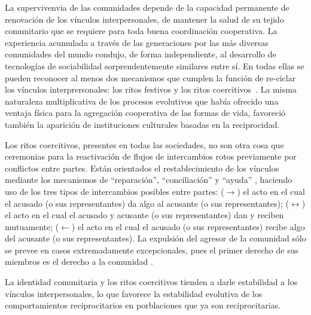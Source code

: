 \documentclass[a4paper,10pt]{book}
\theoremstyle{definition}
\begin{document}

La supervivenvia de las comunidades depende de la capacidad permanente de renovación de los vínculos interpersonales, de mantener la salud de su tejido comunitario que se requiere para toda buena coordinación cooperativa.
La experiencia acumulada a través de las generaciones por las más diversas comunidades del mundo condujo, de forma independiente, al desarrollo de tecnologías de sociabilidad sorprendentemente similares entre sí.
En todas ellas se pueden reconocer al menos dos mecanismos que cumplen la función de re-ciclar los v\'inculos interprersonales: los ritos festivos y los ritos coercitivos~\cite{segato2016-guerraContraLasMujeres}.
La misma naturaleza multiplicativa de los procesos evolutivos que había ofrecido una ventaja física para la agregación cooperativa de las formas de vida, favoreció también la aparición de instituciones culturales basadas en la reciprocidad.


Los ritos coercitivos, presentes en todas las sociedades, no son otra cosa que ceremonias para la reactivación de flujos de intercambios rotos previamente por conflictos entre partes.
Están orientados el restablecimiento de los vínculos mediante los mecanismos de ``reparación'', ``conciliación'' y ``ayuda'' \cite{zaffaroni2013-cuestionCriminal}, haciendo uso de los tres tipos de intercambios posibles entre partes: 
($\rightarrow$) el acto en el cual el acusado (o sus representantes) da algo al acusante (o sus representantes);
($\leftrightarrow$) el acto en el cual el acusado y acusante (o sus representantes) dan y reciben mutuamente;
($\leftarrow$) el acto en el cual el acusado (o sus representantes) recibe algo del acusante (o sus representantes).
La expulsión del agresor de la comunidad sólo se prevee en casos extremadamente excepcionales, pues el primer derecho de sus miembros es el derecho a la comunidad \cite{segato}.


La identidad comunitaria y los ritos coercitivos tienden a darle estabilidad a los vínculos interpersonales, lo que favorece la estabilidad evolutiva de los comportamientos reciprocitarios en porblaciones que ya son reciprocitarias.

\end{document}
